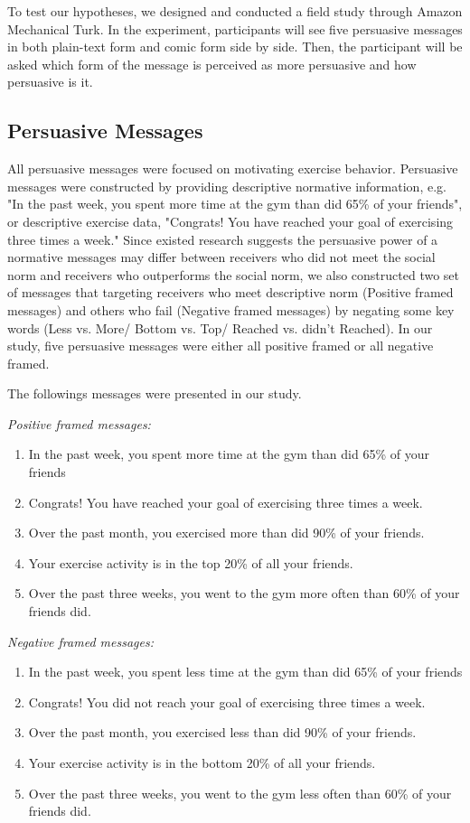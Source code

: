 
To test our hypotheses, we designed and conducted a field study through Amazon Mechanical Turk. In the experiment, participants will see five persuasive messages in both plain-text form and comic form side by side. Then, the participant will be asked which form of the message is perceived as more persuasive and how persuasive is it.
\subsection{Persuasive Messages}
All persuasive messages were focused on motivating exercise behavior. Persuasive messages were constructed by providing descriptive normative information, e.g. "In the past week, you spent more time at the gym than did 65\% of your friends", or descriptive exercise data, "Congrats! You have reached your goal of exercising three times a week." Since existed research suggests the persuasive power of a normative messages may differ between receivers who did not meet the social norm and receivers who outperforms the social norm, we also constructed two set of messages that targeting receivers who meet descriptive norm (Positive framed messages) and others who fail (Negative framed messages) by negating some key words (Less vs. More/ Bottom vs. Top/ Reached vs. didn't Reached). In our study, five persuasive messages were either all positive framed or all negative framed.\par
The followings messages were presented in our study.\par
\textit{Positive framed messages:}
\begin{enumerate}
  \item In the past week, you spent more time at the gym than did 65\% of your friends
  \item Congrats! You have reached your goal of exercising three times a week.
  \item Over the past month, you exercised more than did 90\% of your friends.
  \item Your exercise activity is in the top 20\% of all your friends.
  \item Over the past three weeks, you went to the gym more often than 60\% of your friends did.
\end{enumerate}\par
\textit{Negative framed messages:}
\begin{enumerate}
\item	In the past week, you spent less time at the gym than did 65\% of your friends
\item Congrats! You did not reach your goal of exercising three times a week.
\item	Over the past month, you exercised less than did 90\% of your friends.
\item	Your exercise activity is in the bottom 20\% of all your friends.
\item	Over the past three weeks, you went to the gym less often than 60\% of your friends did.
\end{enumerate}\par
